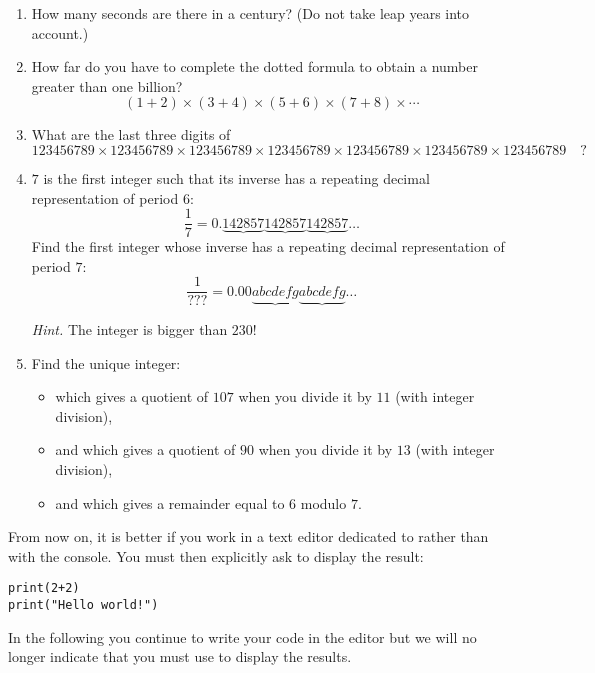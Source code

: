 \documentclass[11pt,class=report,crop=false]{standalone}
\begin{document}
\begin{activite}


\begin{enumerate}
  \item How many seconds are there in a century? (Do not take leap years into account.)
  
  \item How far do you have to complete the dotted formula to obtain a number greater than one billion?
  $$(1+2)\times(3+4)\times(5+6)\times(7+8)\times\cdots$$
  
  \item What are the last three digits of 
  {\footnotesize
  $$123456789 \times 123456789 \times 123456789 \times 123456789 \times 123456789 \times 123456789 \times 123456789 \quad ?$$
  }
  \item $7$ is the first integer such that its inverse has a repeating decimal representation of period $6$:
  $$\frac{1}{7} = 0.\underbrace{142857}\underbrace{142857}\underbrace{142857}\ldots$$ 
  Find the first integer whose inverse has a repeating decimal representation of period $7$:
  $$\frac{1}{???} = 0.00\underbrace{abcdefg}\underbrace{abcdefg}\ldots$$
  
  \emph{Hint.} The integer is bigger than $230$!
  
  \item Find the unique integer:
  \begin{itemize}
    \item which gives a quotient of $107$ when you divide it by $11$ (with integer division),
    \item and which gives a quotient of $90$ when you divide it by $13$ (with integer division),
    \item and which gives a remainder equal to $6$ modulo $7$.
  \end{itemize}
    
\end{enumerate}

\end{activite}


\begin{cours}
From now on, it is better if you work in a text editor dedicated to \Python{} rather than with the console. You must then explicitly ask to display the result:
\begin{lstlisting}
print(2+2)
print("Hello world!")
\end{lstlisting}

In the following you continue to write your code in the editor but we will no longer indicate that you must use  to display the results.
\end{cours}
\end{document}
